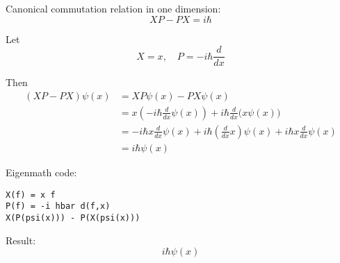 \documentclass[12pt]{article}
\begin{document}
\iffalse
Fedak  and Prentis write
\begin{quote}
The theory of Fourier and the correspondence principle of Bohr
played a vital role in Heisenberg's development of quantum mechanics.
\end{quote}

Aitchison, MacManus, and Snyder write
\begin{quote}
This `difficulty’ clearly unsettled Heisenberg: but it very
quickly became clear that the non-commutativity (in general) of kinematical
quantities in quantum theory was the really essential new technical idea in the
paper.
\end{quote}
\fi

Canonical commutation relation in one dimension:
\begin{equation*}
XP-PX=i\hbar
\end{equation*}

Let
\begin{equation*}
X=x,\quad P=-i\hbar\frac{d}{dx}
\end{equation*}

Then
\begin{align*}
(XP-PX)\psi(x)&=XP\psi(x)-PX\psi(x)
\\
&=x\left(-i\hbar\frac{d}{dx}\psi(x)\right)+i\hbar\frac{d}{dx}\bigl(x\psi(x)\bigr)
\\
&=-i\hbar x\frac{d}{dx}\psi(x)+i\hbar\left(\frac{d}{dx}x\right)\psi(x)+i\hbar x\frac{d}{dx}\psi(x)
\\
&=i\hbar\psi(x)
\end{align*}

Eigenmath code:
\begin{verbatim}
X(f) = x f
P(f) = -i hbar d(f,x)
X(P(psi(x))) - P(X(psi(x)))
\end{verbatim}

Result:
\begin{equation*}
i\hbar\psi(x)
\end{equation*}

\iffalse
Commutation relation in three dimensions.
\begin{equation*}
X_1P_1-P_1X_1=i\hbar,\quad
X_2P_2-P_2X_2=i\hbar,\quad
X_3P_3-P_3X_3=i\hbar
\end{equation*}

and
\begin{equation*}
X_jP_k-P_kX_j=0,\quad j\ne k
\end{equation*}
\fi
\end{document}
